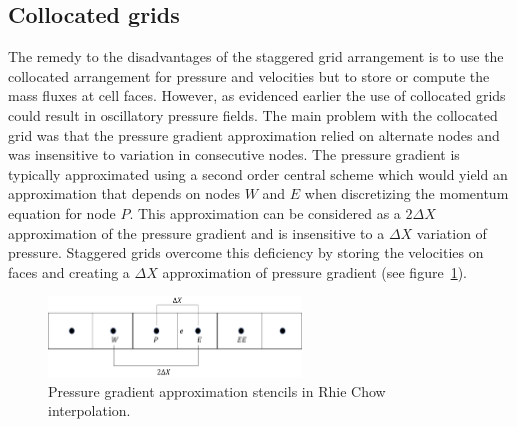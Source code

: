 \subsection{Collocated grids}\label{ssec:collocated}
The remedy to the disadvantages of the staggered grid arrangement is to use the collocated arrangement for pressure and velocities but to store or compute the mass fluxes at cell faces. However, as evidenced earlier the use of collocated grids could result in oscillatory pressure fields. The main problem with the collocated grid was that the pressure gradient approximation relied on alternate nodes and was insensitive to variation in consecutive nodes. The pressure gradient is typically approximated using a second order central scheme which would yield an approximation that depends on nodes $W$ and $E$ when discretizing the momentum equation for node $P$. This approximation can be considered as a $2\Delta X$ approximation of the pressure gradient and is insensitive to a $\Delta X$ variation of pressure. Staggered grids overcome this deficiency by storing the velocities on faces and creating a $\Delta X$ approximation of pressure gradient (see figure~\ref{fig:faceinterp}). 
\begin{figure}[h]
\centering
\captionsetup{justification=centering}
 \includegraphics[width=0.6\textwidth]{ch2_litsurvey/Figures/RCinterp_pressureapprox.png}
\caption{Pressure gradient approximation stencils in Rhie Chow interpolation.}
 \label{fig:faceinterp}
\end{figure}

